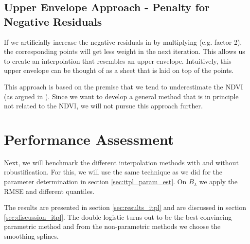 {	\subsection{Upper Envelope Approach - Penalty for Negative Residuals}
		If we artificially increase the negative residuals in  by multiplying (e.g. factor 2), the corresponding points will get less weight in the next iteration. This allows us to create an interpolation that resembles an upper envelope. Intuitively, this upper envelope can be thought of as a sheet that is laid on top of the points.
			
		This approach is based on the premise that we tend to underestimate the NDVI (as argued in \cite{caoSimpleMethodImprove2018b}). Since we want to develop a general method that is in principle not related to the NDVI, we will not pursue this approach further.	
}
\section{Performance Assessment}{
	Next, we will benchmark the different interpolation methods with and without robustification. For this, we will use the same technique as we did for the parameter determination in section \ref{sec:itpl_param_est}. On $B_\lambda$ we apply the RMSE and different quantiles.  

	The results are presented in section \ref{sec:results_itpl} and are discussed in section \ref{sec:discussion_itpl}. The double logistic turns out to be the best convincing parametric method and from the non-parametric methods we choose the smoothing splines.
}


